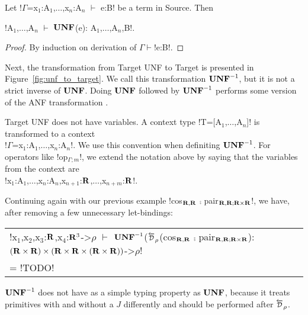 \begin{lemma}
    Let !$\Gamma$=x$_1$:A$_{1}$,$\ldots$,x$_n$:A$_{n}$ $\vdash$ e:B! be a term in Source. Then
    \begin{center}
        !A$_{1}$,$\ldots$,A$_{n}$ $\vdash$ $\mathbf{UNF}$(e): A$_{1}$,$\ldots$,A$_{n}$,B!.
    \end{center}
\end{lemma}
\begin{proof}
    By induction on derivation of $\Gamma\vdash$!e:B!.
\end{proof}




Next, the transformation from Target UNF to Target is presented in Figure~\ref{fig:unf_to_target}. 
We call this transformation $\mathbf{UNF}^{-1}$, but it is not a strict inverse of $\mathbf{UNF}$.
Doing $\mathbf{UNF}$ followed by $\mathbf{UNF}^{-1}$ performs some version of the ANF transformation \cite{sabry1993reasoning}.

Target UNF does not have variables. 
A context type !T=[A$_1$,$\ldots$,A$_n$]! is transformed to a context \\
!$\Gamma$=x$_1$:A$_1$,$\ldots$,x$_n$:A$_n$!.
We use this convention when definiting $\mathbf{UNF}^{-1}$. 
For operators like !op$_{\Gamma;m}$!, we extend the notation above by saying that the variables from the context are \\
!x$_1$:A$_1$,$\ldots$,x$_n$:A$_n$,x$_{n+1}$:$\mathbf{R}$,$\ldots$,x$_{n+m}$:$\mathbf{R}$!.

\begin{example}
    Continuing again with our previous example !cos$_{\mathbf{R},\mathbf{R}}$ $\comp$ pair$_{\mathbf{R},\mathbf{R}; \mathbf{R}\times\mathbf{R}}$!, 
    we have, after removing a few unnecessary let-bindings:

    \begin{tabular}{l}
        !x$_1$,x$_2$,x$_3$:$\mathbf{R}$,x$_4$:$\mathbf{R}^3$->$\rho$ $\vdash$ $\mathbf{UNF}^{-1}$($\Dsynrevsymbol_{\rho}$(cos$_{\mathbf{R},\mathbf{R}}$ $\comp$ pair$_{\mathbf{R},\mathbf{R}; \mathbf{R}\times\mathbf{R}}$): $(\mathbf{R}\times\mathbf{R}) \times (\mathbf{R}\times\mathbf{R}\times(\mathbf{R}\times\mathbf{R}))$->$\rho$! \\
        = !TODO!
    \end{tabular}
\end{example}

$\mathbf{UNF}^{-1}$ does not have as a simple typing property as $\mathbf{UNF}$, 
because it treats primitives with and without a $J$ differently and should be performed after $\Dsynrevsymbol_{\rho}$.

